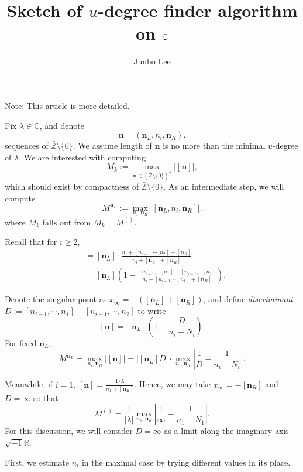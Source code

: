 \documentclass{article}
\title{Sketch of $u$-degree finder algorithm on $\bC$}
\author{Junho Lee}
\theoremstyle{definition}
\theoremstyle{plain}
\theoremstyle{remark}
\numberwithin{equation}{section}
\newcommand{\bZ}{\mathbb{Z}}
\newcommand{\bR}{\mathbb{R}}
\newcommand{\bC}{\mathbb{C}}
\newcommand{\abs}[1]{\left| {#1} \right|}
\newcommand{\im}{{\sqrt{-1}}}
\def\ns{{\mathbf{n}}}
\def\nsL{{\mathbf{n}_L}}
\def\nsR{{\mathbf{n}_R}}
\begin{document}
\maketitle

Note: This article is more detailed.

Fix $\lambda \in \bC$, and denote
\[
  \ns = (\nsL, n_i, \nsR).
\]
sequences of $\bar{\bZ} \setminus \{0\}$.
We assume length of $\ns$ is no more than the minimal $u$-degree of $\lambda$.
We are interested with computing
\[
  M_k := \max_{\ns \in (\bar{\bZ} \setminus \{0\})^k} \abs{[\ns]},
\]
which should exist by compactness of $\bar{\bZ} \setminus \{0\}$.
As an intermediate step, we will compute
\[ M^{\nsL} := \max_{n_i, \nsR} \abs{[\nsL, n_i, \nsR]}. \]
where $M_k$ falls out from $M_k = M^{()}$.

Recall that for $i \geq 2$,
\begin{align*}
  [\ns] & = [\nsL] \cdot \frac{n_i + [n_{i-1}, \cdots, n_2] + [\nsR]}{n_i + [\overleftarrow{\nsL}] + [\nsR]} \\
  & = [\nsL] \left( 1 - \frac{[n_{i-1}, \cdots, n_1] - [n_{i-1}, \cdots, n_2]}{n_i + [n_{i-1}, \cdots, n_1] + [\nsR]} \right).
\end{align*}

Denote the singular point as $x_\infty = - ([\overleftarrow{\nsL}] + [\nsR])$,
and define \textit{discriminant} $D := [n_{i-1}, \cdots, n_1] - [n_{i-1}, \cdots, n_2]$ to write
\[
  [\ns] = [\nsL] \left( 1 - \frac{D}{n_i - N_i} \right).
\]
For fixed $\nsL$,
\[
  M^{\nsL} = \max_{n_i, \nsR} \abs{[\ns]} = \abs{[\nsL] D} \cdot \max_{n_i, \nsR} \left| \frac{1}{D} - \frac{1}{n_i - N_i} \right|.
\]

Meanwhile, if $i = 1$, $[\ns] = \frac{1 / \lambda}{n_1 + [\nsR]}$.
Hence, we may take $x_{\infty} = - [\nsR]$ and $D = \infty$ so that
\[
  M^{()} = \frac{1}{\abs{\lambda}} \max_{n_1, \nsR} \abs{\frac{1}{\infty} - \frac{1}{n_1 - N_1}}.
\]
For this discussion, we will consider $D = \infty$ as a limit along the imaginary axis $\im \bR$.

First, we estimate $n_i$ in the maximal case by trying different values in its place.
\end{document}
